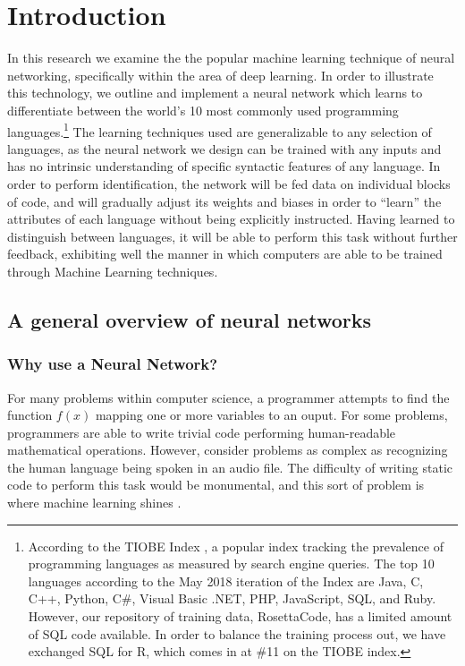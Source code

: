 \documentclass{article}
\begin{document}
\tableofcontents

\section{Introduction}
In this research we examine the the popular machine learning technique of neural networking, specifically within the area of deep learning. In order to illustrate this technology, we outline and implement a neural network which learns to differentiate between the world's 10 most commonly used programming languages.\footnote{According to the TIOBE Index \cite{tiobe}, a popular index tracking the prevalence of programming languages as measured by search engine queries. The top 10 languages according to the May 2018 iteration of the Index are Java, C, C++, Python, C\#, Visual Basic .NET, PHP, JavaScript, SQL, and Ruby. However, our repository of training data, RosettaCode, has a limited amount of SQL code available. In order to balance the training process out, we have exchanged SQL for R, which comes in at \#11 on the TIOBE index.} The learning techniques used are generalizable to any selection of languages, as the neural network we design can be trained with any inputs and has no intrinsic understanding of specific syntactic features of any language. In order to perform identification, the network will be fed data on individual blocks of code, and will gradually adjust its weights and biases in order to ``learn'' the attributes of each language without being explicitly instructed. Having learned to distinguish between languages, it will be able to perform this task without further feedback, exhibiting well the manner in which computers are able to be trained through Machine Learning techniques.


\subsection{A general overview of neural networks}
\subsubsection{Why use a Neural Network?}
For many problems within computer science, a programmer attempts to find the function $f(x)$ mapping one or more variables to an ouput. For some problems, programmers are able to write trivial code performing human-readable mathematical operations. However, consider problems as complex as recognizing the human language being spoken in an audio file. The difficulty of writing static code to perform this task would be monumental, and this sort of problem is where machine learning shines \cite{10algos}.
\end{document}
